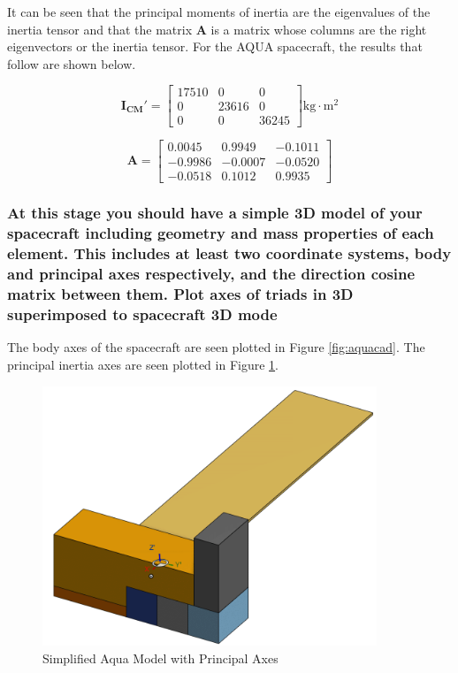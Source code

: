 It can be seen that the principal moments of inertia are the eigenvalues of the inertia tensor and that the matrix $\boldsymbol{A}$ is a matrix whose columns are the right eigenvectors or the inertia tensor. For the AQUA spacecraft, the results that follow are shown below.

\begin{equation*}
    \boldsymbol{I_{CM}'} = \begin{bmatrix}
        17510 & 0 & 0 \\
        0 & 23616 & 0 \\
        0 & 0 & 36245
    \end{bmatrix} \text{kg} \cdot \text{m}^2
\end{equation*}

\begin{equation*}
    \boldsymbol{A} = \begin{bmatrix}
            0.0045  &  0.9949 &  -0.1011 \\
            -0.9986  & -0.0007  & -0.0520 \\
            -0.0518  &  0.1012  &  0.9935
    \end{bmatrix}
\end{equation*}

\subsubsection{At this stage you should have a simple 3D model of your spacecraft including geometry and mass properties of each element. This includes at least two coordinate systems, body and principal axes respectively, and the direction cosine matrix between them. Plot axes of triads in 3D superimposed to spacecraft 3D mode}

The body axes of the spacecraft are seen plotted in Figure \ref{fig:aquacad}. The principal inertia axes are seen plotted in Figure \ref{fig:aquacad_principal}.

\begin{figure}[H]
    \centering
    \includegraphics[width = 10cm]{Images/AquaSat_PrincipalAxes.png}
    \caption{Simplified Aqua Model with Principal Axes}
    \label{fig:aquacad_principal}
\end{figure}

